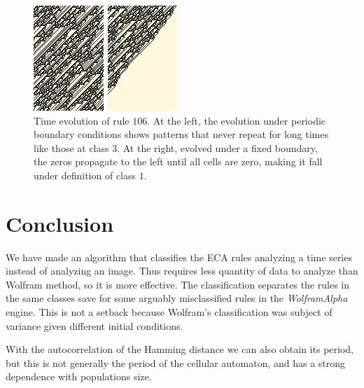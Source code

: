\begin{figure}
    \centering
    \includegraphics[width=\linewidth]{Images/P4/106.png}
    \caption{Time evolution of rule $106$. At the left, the evolution under periodic boundary conditions shows patterns that never repeat for long times like those at class $3$. At the right, evolved under a fixed boundary, the zeros propagate to the left until all cells are zero, making it fall under definition of class $1$.}
    \label{fig:Rule106}
\end{figure}



\section{Conclusion}

We have made an algorithm that classifies the ECA rules analyzing a time series instead of analyzing an image. Thus requires less quantity of data to analyze than Wolfram method, so it is more effective. The classification separates the rules in the same classes save for some arguably misclassified rules in the \textit{WolframAlpha} engine. This is not a setback  because Wolfram's classification was subject of variance given different initial conditions.

With the autocorrelation of the Hamming distance we can also obtain its period, but this is not generally the period of the cellular automaton, and has a strong dependence with populations size.



\clearpage

